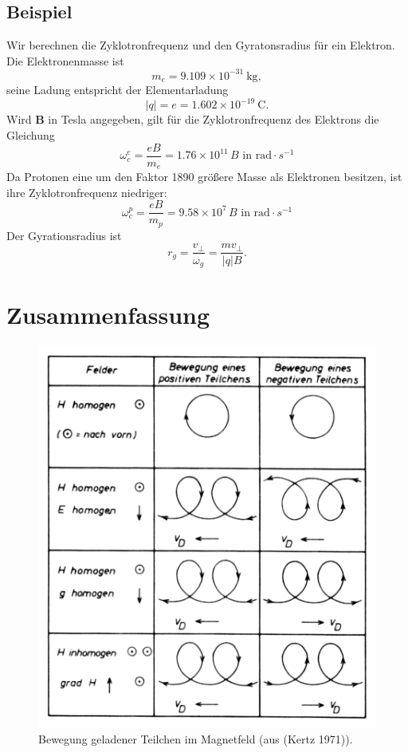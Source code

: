 \documentclass[
  a4paper,
  DIV=11]{scrreprt}
\begin{document}
\hypertarget{beispiel-1}{%
\subsection{Beispiel}\label{beispiel-1}}

Wir berechnen die Zyklotronfrequenz und den Gyratonsradius für ein
Elektron. Die Elektronenmasse ist \[
m_e = 9.109 \times 10^{-31} ~\text{kg},
\] seine Ladung entspricht der Elementarladung \[
|q| = e = 1.602 \times 10^{-19} ~ \text{C}.
\] Wird \(\mathbf B\) in Tesla angegeben, gilt für die Zyklotronfrequenz
des Elektrons die Gleichung \[
\omega_c^e = \frac{e B}{m_e} = 1.76 \times 10^{11} \, B \text{ in rad}\cdot s^{-1}
\] Da Protonen eine um den Faktor 1890 größere Masse als Elektronen
besitzen, ist ihre Zyklotronfrequenz niedriger: \[
\omega_c^p = \frac{e B}{m_p} = 9.58 \times 10^{7} \, B \text{ in rad}\cdot s^{-1}
\] Der Gyrationsradius ist \[
r_g = \frac{v_\perp}{\omega_g} = \frac{m v_\perp}{|q| B}.
\]

\hypertarget{zusammenfassung}{%
\section{Zusammenfassung}\label{zusammenfassung}}

\begin{figure}

{\centering \includegraphics{./images/gyration.png}

}

\caption{Bewegung geladener Teilchen im Magnetfeld (aus (Kertz 1971)).}

\end{figure}
\end{document}
